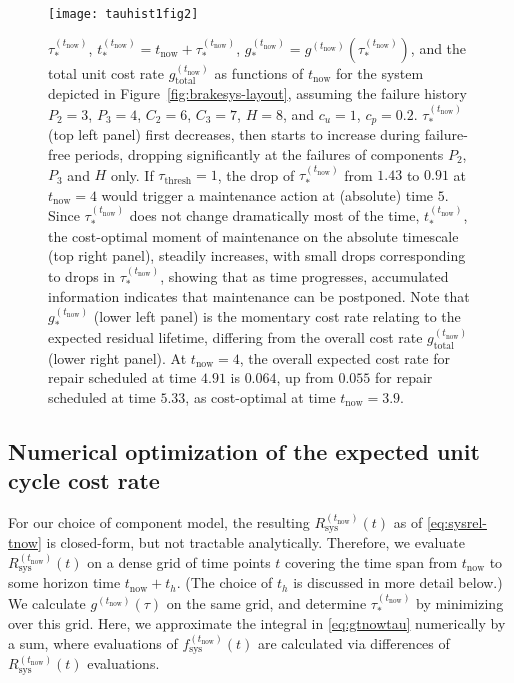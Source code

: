 \documentclass[authoryear]{elsarticle}
\def\tnow{t_\text{now}}
\newcommand{\Rsysnow}{R^{(t_\text{now})}_\text{sys}}
\newcommand{\fsysnow}{f^{(t_\text{now})}_\text{sys}}
\newcommand{\gnow}{g^{(\tnow)}}
\newcommand{\tausnow}{\tau_*^{(\tnow)}}
\newcommand{\tthresh}{\tau_{\text{thresh}}}
\newcommand{\tstarnow}{t_*^{(\tnow)}}
\newcommand{\gstarnow}{g_*^{(\tnow)}}
\newcommand{\gtotalnow}{g_\text{total}^{(\tnow)}}
\begin{document}
\begin{figure}
\texttt{[image: tauhist1fig2]}
\caption{$\tausnow$, $\tstarnow = \tnow + \tausnow$, $\gstarnow = \gnow(\tausnow)$,
and the total unit cost rate $\gtotalnow$ as functions of $\tnow$
for the system depicted in Figure~\ref{fig:brakesys-layout},
assuming the failure history $P_2 = 3$, $P_3 = 4$, $C_2 = 6$, $C_3 = 7$, $H = 8$,
and $c_u = 1$, $c_p = 0.2$.
$\tausnow$ (top left panel) first decreases, then starts to increase during failure-free periods,
dropping significantly at the failures of components $P_2$, $P_3$ and $H$ only.
If $\tthresh = 1$, the drop of $\tausnow$ from $1.43$ to $0.91$ at $\tnow = 4$ would trigger a maintenance action
at (absolute) time $5$.
Since $\tausnow$ does not change dramatically most of the time, $\tstarnow$,
the cost-optimal moment of maintenance on the absolute timescale (top right panel),
steadily increases, with small drops corresponding to drops in $\tausnow$,
showing that as time progresses, accumulated information indicates that maintenance can be postponed.
Note that $\gstarnow$ (lower left panel) is the momentary cost rate relating to the expected residual lifetime,
differing from the overall cost rate $\gtotalnow$ (lower right panel).
At $\tnow = 4$, the overall expected cost rate for repair scheduled at time $4.91$ is $0.064$,
up from $0.055$ for repair scheduled at time $5.33$, as cost-optimal at time $\tnow = 3.9$.}
\label{fig:tauhist1fig2}
\end{figure}

\subsection{Numerical optimization of the expected unit cycle cost rate}
\label{sec:optim}

For our choice of component model,
the resulting $\Rsysnow(t)$ as of \eqref{eq:sysrel-tnow}
is closed-form, but not tractable analytically.
Therefore,
we evaluate $\Rsysnow(t)$ on a dense grid of time points $t$
covering the time span from $\tnow$ to some horizon time $\tnow + t_h$.
(The choice of $t_h$ is discussed in more detail below.)
We calculate $\gnow(\tau)$ on the same grid,
and determine $\tausnow$ by minimizing over this grid.
Here, we approximate the integral in \eqref{eq:gtnowtau} numerically by a sum,
where evaluations of $\fsysnow(t)$ are calculated via differences of $\Rsysnow(t)$ evaluations.
\end{document}
